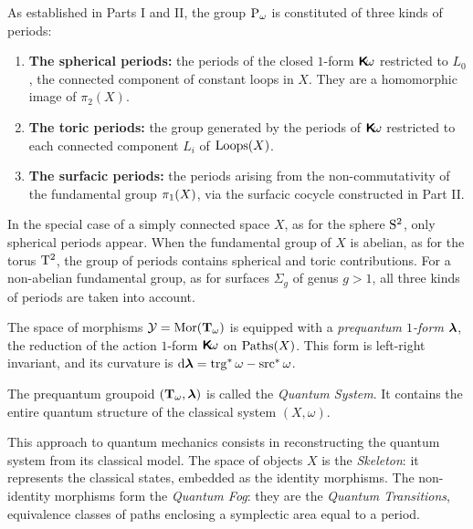 \documentclass[11pt,reqno,letterpaper,twoside]{amsart}
\renewcommand{\TT}{\Groupoid{T}}
\renewcommand{\Komega}{\CHO\!\omega}
\begin{document}
  As established in Parts I and II,
  the group $\operatorname{P}_\omega$ is constituted of three kinds of periods:
  \begin{enumerate}[nosep]
    \item \textbf{The spherical periods:}
    the periods of the closed $1$-form $\Komega$ restricted to $L_0$,
    the connected component of constant loops in $X$.
    They are a homomorphic image of $\pi_2(X)$.
    \item \textbf{The toric periods:}
    the group generated by the periods of $\Komega$ restricted to each connected component $L_i$ of $\operatorname{Loops}(X)$.
    \item \textbf{The surfacic periods:}
    the periods arising from the non-commutativity
    of the fundamental group $\pi_1(X)$,
    via the surfacic cocycle constructed in Part II.
  \end{enumerate}
  
  In the special case of a simply connected space $X$,
  as for the sphere $\mathrm{S}^2$,
  only spherical periods appear.
  When the fundamental group of $X$ is abelian,
  as for the torus $\mathrm{T}^2$,
  the group of periods contains spherical and toric contributions.
  For a non-abelian fundamental group,
  as for surfaces $\Sigma_g$ of genus $g > 1$,
  all three kinds of periods are taken into account.
  
  The space of morphisms $\cY = \Mor(\TT_\omega)$ is equipped with a \emph{prequantum $1$-form} $\boldsymbol \lambda$,
  the reduction of the action $1$-form $\Komega$ on $\operatorname{Paths}(X)$.
  This form is left-right invariant,
  and its curvature is $\mathrm{d}\boldsymbol \lambda = \operatorname{trg}^*\omega - \operatorname{src}^*\omega$.
  
  The prequantum groupoid $(\TT_\omega, \blambda)$ is called the \emph{Quantum System}.
  It contains the entire quantum structure of the classical system $(X,\omega)$.
  
  This approach to quantum mechanics consists in reconstructing the quantum system
  from its classical model.
  The space of objects $X$ is the \emph{Skeleton}:
  it represents the classical states,
  embedded as the identity morphisms.
  The non-identity morphisms form the \emph{Quantum Fog}:
  they are the \emph{Quantum Transitions},
  equivalence classes of paths enclosing a symplectic area equal to a period.
  
\end{document}
